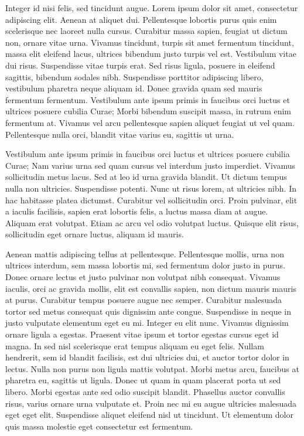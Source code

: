 Integer id nisi felis, sed tincidunt augue.
Lorem ipsum dolor sit amet, consectetur adipiscing elit.
Aenean at aliquet dui.
Pellentesque lobortis purus quis enim scelerisque nec laoreet nulla cursus.
Curabitur massa sapien, feugiat ut dictum non, ornare vitae urna.
Vivamus tincidunt, turpis sit amet fermentum tincidunt, massa elit eleifend lacus, ultrices bibendum justo turpis vel est.
Vestibulum vitae dui risus.
Suspendisse vitae turpis erat.
Sed risus ligula, posuere in eleifend sagittis, bibendum sodales nibh.
Suspendisse porttitor adipiscing libero, vestibulum pharetra neque aliquam id.
Donec gravida quam sed mauris fermentum fermentum.
Vestibulum ante ipsum primis in faucibus orci luctus et ultrices posuere cubilia Curae; Morbi bibendum suscipit massa, in rutrum enim fermentum at.
Vivamus vel arcu pellentesque sapien aliquet feugiat ut vel quam.
Pellentesque nulla orci, blandit vitae varius eu, sagittis ut urna.

Vestibulum ante ipsum primis in faucibus orci luctus et ultrices posuere cubilia Curae; Nam varius urna sed quam cursus vel interdum justo imperdiet.
Vivamus sollicitudin metus lacus.
Sed at leo id urna gravida blandit.
Ut dictum tempus nulla non ultricies.
Suspendisse potenti.
Nunc ut risus lorem, at ultricies nibh.
In hac habitasse platea dictumst.
Curabitur vel sollicitudin orci.
Proin pulvinar, elit a iaculis facilisis, sapien erat lobortis felis, a luctus massa diam at augue.
Aliquam erat volutpat.
Etiam ac arcu vel odio volutpat luctus.
Quisque elit risus, sollicitudin eget ornare luctus, aliquam id mauris.

Aenean mattis adipiscing tellus at pellentesque.
Pellentesque mollis, urna non ultrices interdum, sem massa lobortis mi, sed fermentum dolor justo in purus.
Donec ornare lectus et justo pulvinar non volutpat nibh consequat.
Vivamus iaculis, orci ac gravida mollis, elit est convallis sapien, non dictum mauris mauris at purus.
Curabitur tempus posuere augue nec semper.
Curabitur malesuada tortor sed metus consequat quis dignissim ante congue.
Suspendisse in neque in justo vulputate elementum eget eu mi.
Integer eu elit nunc.
Vivamus dignissim ornare ligula a egestas.
Praesent vitae ipsum et tortor egestas cursus eget id magna.
In sed nisl scelerisque erat tempus aliquam eu eget felis.
Nullam hendrerit, sem id blandit facilisis, est dui ultricies dui, et auctor tortor dolor in lectus.
Nulla non purus non ligula mattis volutpat.
Morbi metus arcu, faucibus at pharetra eu, sagittis ut ligula.
Donec ut quam in quam placerat porta ut sed libero.
Morbi egestas ante sed odio suscipit blandit.
Phasellus auctor convallis risus, varius ornare urna vulputate et.
Proin nec mi eu augue ultricies malesuada eget eget elit.
Suspendisse aliquet eleifend nisl ut tincidunt.
Ut elementum dolor quis massa molestie eget consectetur est fermentum.

